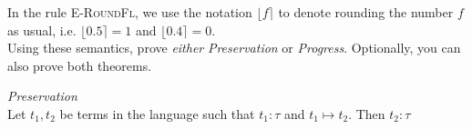 \begin{minipage}{\textwidth}
  \begin{minipage}{0.45\textwidth}
    \begin{prooftree}
    \end{prooftree}
  \end{minipage}
  \hfill
  \begin{minipage}{0.45\textwidth}
    \begin{prooftree}
    \end{prooftree}
  \end{minipage}
  \hfill
  \vspace{1em}
  \begin{minipage}{0.45\textwidth}
    \begin{prooftree}
    \end{prooftree}
  \end{minipage}
  \hfill
  \begin{minipage}{0.45\textwidth}
    \begin{prooftree}
    \end{prooftree}
  \end{minipage}
  \hfill
  \vspace{1em}
  \begin{minipage}{0.45\textwidth}
    \begin{prooftree}
    \end{prooftree}
  \end{minipage}
  \hfill
  \begin{minipage}{0.45\textwidth}
    \begin{prooftree}
    \end{prooftree}
  \end{minipage}
  \hfill
  \vspace{1em}
\end{minipage}
In the rule \textsc{E-RoundFl}, we use the notation $\lfloor f\rceil$ to denote rounding the number $f$ as usual, i.e. $\lfloor 0.5 \rceil = 1$ and $\lfloor 0.4 \rceil = 0$.\\
Using these semantics, prove \emph{either} \emph{Preservation} or \emph{Progress}. 
Optionally, you can also prove both theorems.
\begin{theorem}\emph{Preservation}\\
  Let $t_1,t_2$ be terms in the language such that $t_1:\tau$ and $t_1\mapsto t_2$. 
  Then $t_2:\tau$
\end{theorem}

